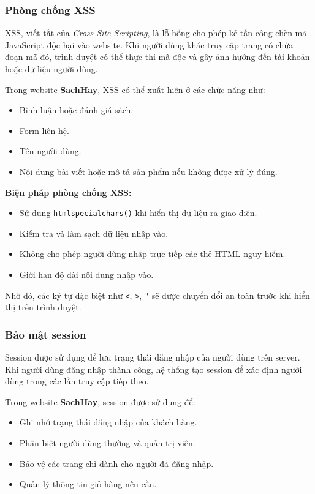 \subsubsection{Phòng chống XSS}

XSS, viết tắt của \textit{Cross-Site Scripting}, là lỗ hổng cho phép kẻ tấn công chèn mã JavaScript độc hại vào website. Khi người dùng khác truy cập trang có chứa đoạn mã đó, trình duyệt có thể thực thi mã độc và gây ảnh hưởng đến tài khoản hoặc dữ liệu người dùng.

Trong website \textbf{SachHay}, XSS có thể xuất hiện ở các chức năng như:

\begin{itemize}
	\item Bình luận hoặc đánh giá sách.
	\item Form liên hệ.
	\item Tên người dùng.
	\item Nội dung bài viết hoặc mô tả sản phẩm nếu không được xử lý đúng.
\end{itemize}

\textbf{Biện pháp phòng chống XSS:}

\begin{itemize}
	\item Sử dụng \texttt{htmlspecialchars()} khi hiển thị dữ liệu ra giao diện.
	\item Kiểm tra và làm sạch dữ liệu nhập vào.
	\item Không cho phép người dùng nhập trực tiếp các thẻ HTML nguy hiểm.
	\item Giới hạn độ dài nội dung nhập vào.
\end{itemize}

Nhờ đó, các ký tự đặc biệt như \texttt{<}, \texttt{>}, \texttt{"} sẽ được chuyển đổi an toàn trước khi hiển thị trên trình duyệt.

\subsubsection{Bảo mật session}

Session được sử dụng để lưu trạng thái đăng nhập của người dùng trên server. Khi người dùng đăng nhập thành công, hệ thống tạo session để xác định người dùng trong các lần truy cập tiếp theo.

Trong website \textbf{SachHay}, session được sử dụng để:

\begin{itemize}
	\item Ghi nhớ trạng thái đăng nhập của khách hàng.
	\item Phân biệt người dùng thường và quản trị viên.
	\item Bảo vệ các trang chỉ dành cho người đã đăng nhập.
	\item Quản lý thông tin giỏ hàng nếu cần.
\end{itemize}


